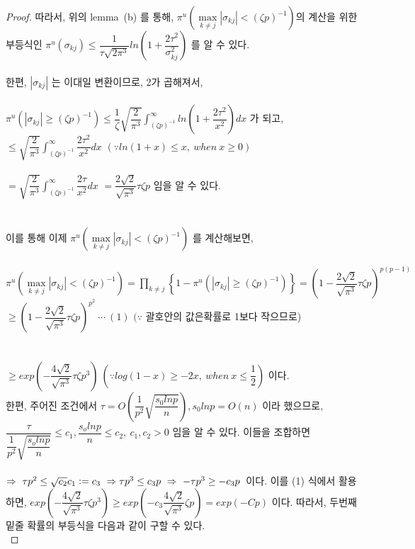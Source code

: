 \begin{proof}
\noindent
따라서, 위의 lemma\ (b) 를 통해, $\pi^u(\max\limits_{k \neq j}|\sigma_{kj}|< (\zeta p)^{-1})$의 계산을 위한 부등식인 $\pi^u(\sigma_{kj})\leq \dfrac{1}{\tau \sqrt{2\pi^3}}ln\left(1+\dfrac{2\tau^2}{\sigma_{kj}^2}\right)$ 를 알 수 있다.\\
\\
한편, $|\sigma_{kj}|$ 는 이대일 변환이므로, 2가 곱해져서,\\
\\
$\pi^u(|\sigma_{kj}|\geq(\zeta p)^{-1})\leq \dfrac{1}{\zeta}\sqrt{\dfrac{2}{\pi^3}} \displaystyle \int_{(\zeta p)^{-1}}^{\infty}ln\left(1+\dfrac{2\tau^2}{x^2}\right) dx$ 가 되고,\\
$\leq \sqrt{\dfrac{2}{\pi^3}} \displaystyle \int_{(\zeta p)^{-1}}^{\infty}\dfrac{2\tau^2}{x^2} dx$ $( \because ln(1+x) \leq x, \ when\ x\geq 0)$\\
\\
$= \sqrt{\dfrac{2}{\pi^3}} \displaystyle \int_{(\zeta p)^{-1}}^{\infty}\dfrac{2\tau}{x^2} dx$
$=\dfrac{2\sqrt{2}}{\sqrt{\pi^3}}\tau\zeta p $ 임을 알 수 있다.\\
\\
\\
이를 통해 이제 $\pi^u(\max\limits_{k \neq j}|\sigma_{kj}|< (\zeta p)^{-1})$ 를 계산해보면,\\
\\
$\pi^u(\max\limits_{k \neq j}|\sigma_{kj}|< (\zeta p)^{-1}) = \prod\limits_{k\neq j} \left\{    1-\pi^u(|\sigma_{kj}|\geq (\zeta p)^{-1})   \right\} = \left(1-\dfrac{2\sqrt{2}}{\sqrt{\pi^3}}\tau\zeta p\right)^{p(p-1)}$ \\
$\geq \left(1-\dfrac{2\sqrt{2}}{\sqrt{\pi^3}}\tau\zeta p\right)^{p^2} \ \cdots \ (1) $ $(\because$ 괄호안의 값은확률로 1보다 작으므로)\\
\\
\\
$\geq exp\left(-\dfrac{4\sqrt{2}}{\sqrt{\pi^3}}\tau \zeta p^3\right) \ (\because log(1-x) \geq -2x,\ when\ x\leq \dfrac{1}{2})$ 이다.\\
한편, 주어진 조건에서 $\tau=O\left(\dfrac{1}{p^2}\sqrt{\dfrac{s_0lnp}{n}}\right), s_0lnp=O(n)$ 이라 했으므로,\\
$\dfrac{\tau}{\dfrac{1}{p^2}\sqrt{\dfrac{s_olnp}{n}}}\leq c_1, \dfrac{s_olnp}{n}\leq c_2,\ c_1,c_2>0$ 임을 알 수 있다. 이들을 조합하면\\
\\
$\Rightarrow \ \tau p^2 \leq \sqrt{c_2}c_1 \mathrel{\mathop:}= c_3 \ \Rightarrow \tau p^3 \leq c_3p\ \Rightarrow \ -\tau p^3 \geq -c_3p $\ 이다. 이를 (1) 식에서 활용하면, $exp\left(-\dfrac{4\sqrt{2}}{\sqrt{\pi^3}}\tau \zeta p^3\right) \geq exp\left(-c_3 \dfrac{4\sqrt{2}}{\sqrt{\pi^3}} \zeta p\right)=exp(-Cp)$ 이다. 따라서, 두번째 밑줄 확률의 부등식을 다음과 같이 구할 수 있다.\\

\end{proof}
